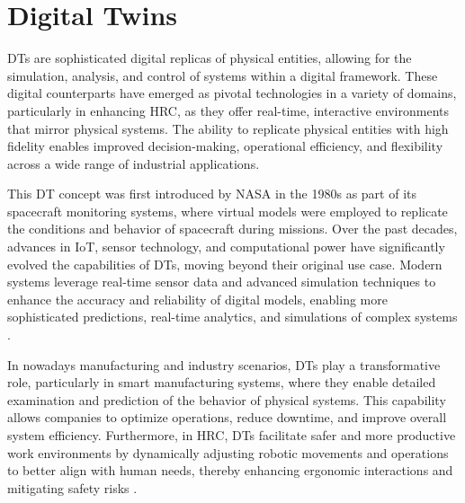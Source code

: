 



\section{Digital Twins}

\ac{DTs} are sophisticated digital replicas of physical entities, allowing for the simulation, analysis, and control of systems within a digital framework. These digital counterparts have emerged as pivotal technologies in a variety of domains, particularly in enhancing \ac{HRC}, as they offer real-time, interactive environments that mirror physical systems. The ability to replicate physical entities with high fidelity enables improved decision-making, operational efficiency, and flexibility across a wide range of industrial applications.

This \ac{DT} concept was first introduced by NASA in the 1980s as part of its spacecraft monitoring systems, where virtual models were employed to replicate the conditions and behavior of spacecraft during missions. Over the past decades, advances in \ac{IoT}, sensor technology, and computational power have significantly evolved the capabilities of \ac{DTs}, moving beyond their original use case. Modern systems leverage real-time sensor data and advanced simulation techniques to enhance the accuracy and reliability of digital models, enabling more sophisticated predictions, real-time analytics, and simulations of complex systems \cite{liu2022digitaltwin}.

In nowadays manufacturing and industry scenarios, \ac{DTs} play a transformative role, particularly in smart manufacturing systems, where they enable detailed examination and prediction of the behavior of physical systems. This capability allows companies to optimize operations, reduce downtime, and improve overall system efficiency. Furthermore, in \ac{HRC}, \ac{DTs} facilitate safer and more productive work environments by dynamically adjusting robotic movements and operations to better align with human needs, thereby enhancing ergonomic interactions and mitigating safety risks \cite{8477101}.

